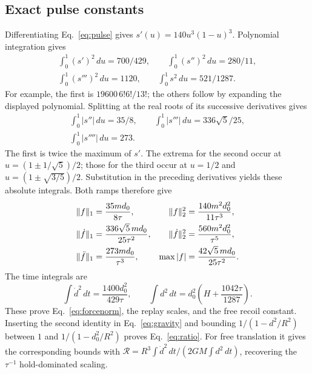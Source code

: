 \subsection{Exact pulse constants}
Differentiating Eq.~\eqref{eq:pulse} gives $s'(u)=140u^3(1-u)^3$. Polynomial integration gives
\begin{equation}
\begin{gathered}
\int_0^1(s')^2\,du=700/429,\qquad
\int_0^1(s'')^2\,du=280/11,\\
\int_0^1(s''')^2\,du=1120,\qquad
\int_0^1s^2\,du=521/1287.
\end{gathered}
\label{eq:polyL2}
\end{equation}
For example, the first is $19600\,6!6!/13!$; the others follow by expanding the displayed polynomial. Splitting at the real roots of its successive derivatives gives
\begin{equation}
\begin{gathered}
\int_0^1|s''|\,du=35/8,\qquad
\int_0^1|s'''|\,du=336\sqrt5/25,\\
\int_0^1|s''''|\,du=273.
\end{gathered}
\label{eq:polyL1}
\end{equation}
The first is twice the maximum of $s'$. The extrema for the second occur at $u=(1\pm1/\sqrt5)/2$; those for the third occur at $u=1/2$ and $u=(1\pm\sqrt{3/5})/2$. Substitution in the preceding derivatives yields these absolute integrals. Both ramps therefore give
\begin{equation}
\begin{aligned}
\norm f_1&=\frac{35md_0}{8\tau},&\norm f_2^2&=\frac{140m^2d_0^2}{11\tau^3},\\
\norm{\dot f}_1&=\frac{336\sqrt5\,md_0}{25\tau^2},&\norm{\dot f}_2^2&=\frac{560m^2d_0^2}{\tau^5},\\
\norm{\ddot f}_1&=\frac{273md_0}{\tau^3},&\max|f|&=\frac{42\sqrt5\,md_0}{25\tau^2}.
\end{aligned}
\label{eq:allnorms}
\end{equation}
The time integrals are
\begin{equation}
\int\dot d^2\,dt=\frac{1400d_0^2}{429\tau},\qquad
\int d^2\,dt=d_0^2\left(H+\frac{1042\tau}{1287}\right).
\label{eq:pathnorms}
\end{equation}
These prove Eq.~\eqref{eq:forcenorm}, the replay scales, and the free recoil constant. Inserting the second identity in Eq.~\eqref{eq:gravity} and bounding $1/(1-d^2/R^2)$ between $1$ and $1/(1-d_0^2/R^2)$ proves Eq.~\eqref{eq:ratio}. For free translation it gives the corresponding bounds with $\mathcal R=R^3\int\dot d^2\,dt/(2GM\int d^2\,dt)$, recovering the $\tau^{-1}$ hold-dominated scaling.

